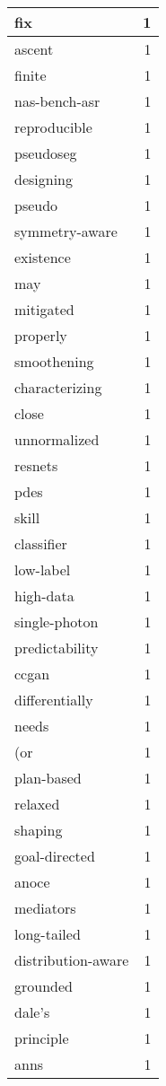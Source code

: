 \begin{table}[h]
\begin{tabular}{|l|r|}
\hline
fix & 1 \\
\hline
ascent & 1 \\
\hline
finite & 1 \\
\hline
nas-bench-asr & 1 \\
\hline
reproducible & 1 \\
\hline
pseudoseg & 1 \\
\hline
designing & 1 \\
\hline
pseudo & 1 \\
\hline
symmetry-aware & 1 \\
\hline
existence & 1 \\
\hline
may & 1 \\
\hline
mitigated & 1 \\
\hline
properly & 1 \\
\hline
smoothening & 1 \\
\hline
characterizing & 1 \\
\hline
close & 1 \\
\hline
unnormalized & 1 \\
\hline
resnets & 1 \\
\hline
pdes & 1 \\
\hline
skill & 1 \\
\hline
classifier & 1 \\
\hline
low-label & 1 \\
\hline
high-data & 1 \\
\hline
single-photon & 1 \\
\hline
predictability & 1 \\
\hline
ccgan & 1 \\
\hline
differentially & 1 \\
\hline
needs & 1 \\
\hline
(or & 1 \\
\hline
plan-based & 1 \\
\hline
relaxed & 1 \\
\hline
shaping & 1 \\
\hline
goal-directed & 1 \\
\hline
anoce & 1 \\
\hline
mediators & 1 \\
\hline
long-tailed & 1 \\
\hline
distribution-aware & 1 \\
\hline
grounded & 1 \\
\hline
dale's & 1 \\
\hline
principle & 1 \\
\hline
anns & 1 \\

\end{tabular}
\end{table}
